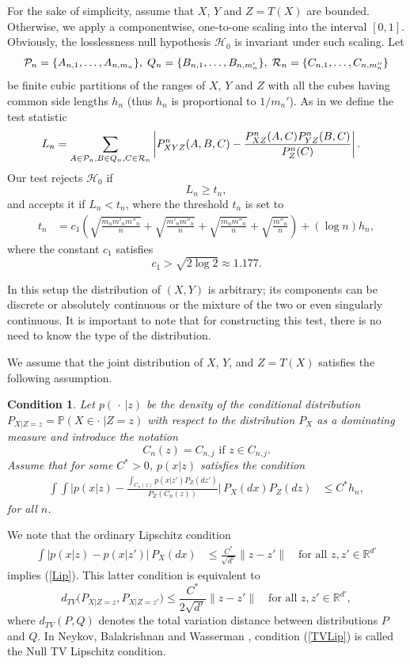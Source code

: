 \documentclass[11pt]{article}
\newtheorem{condition}{Condition}
\def\Q{Q}
\def\R{{\mathbb R}}
\def\P{\mathcal{P}}
\def\PROB {{\mathbb P}}
\begin{document}
For the sake of simplicity, assume that $X$, $Y$ and $Z=T(X)$ are bounded.
Otherwise, we apply a componentwise, one-to-one scaling into the interval $[0,1]$. 
Obviously, the losslessness null hypothesis $\mathcal H_0$ is invariant under such scaling.
Let
\[
\P _n=\{A_{n,1},\ldots ,A_{n,m_n}\}, \; \Q _n=\{B_{n,1},\ldots ,B_{n,m'_n}\}, \; {\cal R}_n=\{C_{n,1},\ldots ,C_{n,m''_n}\}
\]
be  finite cubic partitions of the ranges of $X$, $Y$ and $Z$  with all the cubes having common side lengths  $h_n$ (thus $h_n$ is proportional to $1/m_n'$). As in  \cite{GyWa12} we define the test statistic  
\begin{align}
\label{Ln}
L_n
&= \sum_{A\in \P_n,B\in \Q_n,C\in {\cal R}_n}
\left|P^n_{XYZ}(A,B,C)
-\frac{P^n_{XZ}(A,C)P^n_{YZ}(B,C)}{P^n_{Z}(C)}
\right|.
\end{align}
Our test rejects $\mathcal{H}_0$  if 
\[
L_n \ge t_n, 
\]
and accepts it if $L_n< t_n$, where the threshold $t_n$ is set to
\begin{align}
\label{eq-tndef}
t_n &= 
c_1\left(\sqrt{\frac{m_nm'_nm''_n}{n}} + \sqrt{\frac{m'_nm''_n}{n}}
+ \sqrt{\frac{m_nm''_n}{n}}+\sqrt{\frac{m''_n}{n}}\right)+(\log n)h_n, 
\end{align}
where the constant $c_1$ satisfies 
\[
c_1>\sqrt{2\log 2}\approx 1.177.
\]



In this setup the distribution of $(X,Y)$ is arbitrary; its components can be discrete or absolutely continuous or the mixture of the two or even singularly continuous.
It is important to note that for constructing this test, there is no need to know the type of the distribution.


We assume that the joint distribution of $X$, $Y$, and $Z=T(X)$  satisfies the following assumption.

\begin{condition}
\label{cond1}
Let $p(\,\cdot \,| z)$ be the density of the conditional distribution $P_{X|Z=z}=\PROB(X\in \cdot\;|Z=z)$ with respect to the distribution  $P_X$ as a dominating measure and introduce the notation
\[
C_n(z)=C_{n,j} \mbox{ if } z\in C_{n,j}.
\]
Assume  that for some $C^*>0$, $p(x| z)$ satisfies the  condition
\begin{align}
\label{Lip}
\int\int   \bigg|  p(x| z)- \frac{\int_{C_n(z) }p(x|z')P_Z(dz')}{P_Z(C_n(z))}\bigg| \, P_X(dx) P_Z(dz)
&\le
C^*  h_n,
\end{align}
for all $n$.
\end{condition}


We note that the ordinary Lipschitz condition
\begin{align}
\label{TVLip}
\int \big| p(x|z)-p(x| z')\big|\, P_X(dx)
&\le
\frac{C^*}{\sqrt{d'}}\|z-z'\| \quad \text{for all $z,z'\in \R^{d'}$}
\end{align}
implies (\ref{Lip}). This latter condition is equivalent to 
\[
d_{TV}\big(P_{X|Z=z},P_{X|Z=z'}\big) \le \frac{C^*}{2\sqrt{d'}}\|z-z'\| \quad \text{for all $z,z'\in \R^{d'}$}, 
\]
where  $d_{TV}(P,Q)$ denotes the total variation distance between distributions $P$ and $Q$. 
In Neykov,   Balakrishnan and  Wasserman \cite{NeBaWa21}, condition  (\ref{TVLip})
is called the Null TV Lipschitz condition.
\end{document}
